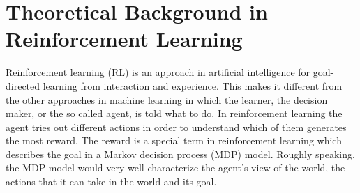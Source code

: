\section{Theoretical Background in Reinforcement Learning}
Reinforcement learning (RL) is an approach in artificial intelligence for goal-directed learning from interaction and experience. This makes it different from the other approaches in machine learning in which the learner, the decision maker, or the so called agent, is told what to do. In reinforcement learning the agent tries out different actions in order to understand which of them generates the most reward. The reward is a special term in reinforcement learning which describes the goal in a Markov decision process (MDP) model. Roughly speaking, the MDP model would very well characterize the agent’s view of the world, the actions that it can take in the world and its goal.

